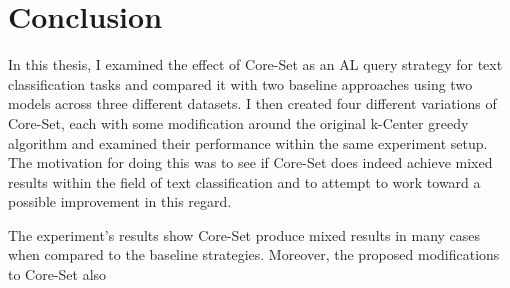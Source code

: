 \documentclass[english,bachelor,ul]{webisthesis} %
\begin{document}
\chapter{Conclusion}

In this thesis, I examined the effect of Core-Set as an AL query strategy for text classification tasks and compared it with two baseline approaches using two models across three different datasets. I then created four different variations of Core-Set, each with some modification around the original k-Center greedy algorithm and examined their performance within the same experiment setup. The motivation for doing this was to see if Core-Set does indeed achieve mixed results within the field of text classification and to attempt to work toward a possible improvement in this regard.

The experiment's results show Core-Set produce mixed results in many cases when compared to the baseline strategies. Moreover, the proposed modifications to Core-Set also   






%
%

%

\end{document}
